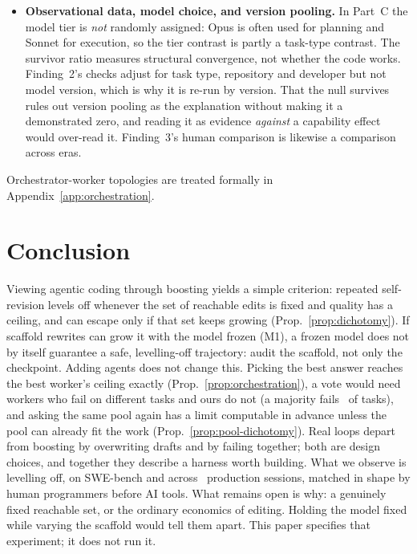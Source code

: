 \documentclass{article}
\theoremstyle{remark}
\theoremstyle{plain}
\begin{document}
\begin{itemize}[leftmargin=*,itemsep=1pt]
    \item \textbf{Observational data, model choice, and version pooling.} In Part~C the model tier is \emph{not} randomly assigned: Opus is often used for planning and Sonnet for execution, so the tier contrast is partly a task-type contrast. The survivor ratio measures structural convergence, not whether the code works. Finding~2's checks adjust for task type, repository and developer but not model version, which is why it is re-run by version. That the null survives rules out version pooling as the explanation without making it a demonstrated zero, and reading it as evidence \emph{against} a capability effect would over-read it. Finding~3's human comparison is likewise a comparison across eras.
\end{itemize}
Orchestrator-worker topologies are treated formally in Appendix~\ref{app:orchestration}.

\section{Conclusion}
\label{sec:conclusion}

Viewing agentic coding through boosting yields a simple criterion: repeated self-revision levels off whenever the set of reachable edits is fixed and quality has a ceiling, and can escape only if that set keeps growing (Prop.~\ref{prop:dichotomy}). If scaffold rewrites can grow it with the model frozen (M1), a frozen model does not by itself guarantee a safe, levelling-off trajectory: audit the scaffold, not only the checkpoint. Adding agents does not change this. Picking the best answer reaches the best worker's ceiling exactly (Prop.~\ref{prop:orchestration}), a vote would need workers who fail on different tasks and ours do not (a majority fails \statPBOverlapViolate\ of tasks), and asking the same pool again has a limit computable in advance unless the pool can already fit the work (Prop.~\ref{prop:pool-dichotomy}). Real loops depart from boosting by overwriting drafts and by failing together; both are design choices, and together they describe a harness worth building. What we observe is levelling off, on SWE-bench and across \statPCSessions\ production sessions, matched in shape by human programmers before AI tools. What remains open is why: a genuinely fixed reachable set, or the ordinary economics of editing. Holding the model fixed while varying the scaffold would tell them apart. This paper specifies that experiment; it does not run it.
\end{document}
